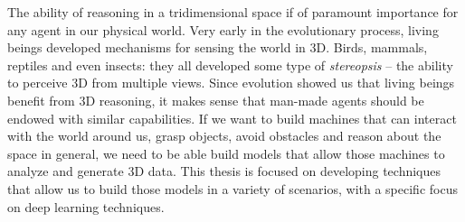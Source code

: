 
The ability of reasoning in a tridimensional space if of paramount importance for any agent in our physical world.
Very early in the evolutionary process, living beings developed mechanisms for sensing the world
in 3D.
Birds, mammals, reptiles and even insects: they all developed some type of \emph{stereopsis} --
the ability to perceive 3D from multiple views.
Since evolution showed us that living beings benefit from 3D reasoning, it makes sense that man-made
agents should be endowed with similar capabilities.
If we want to build machines that can interact with the world around us, grasp objects, avoid obstacles and reason about the space in general, we need to be able build models that allow those machines
to analyze and generate 3D data.
This thesis is focused on developing techniques that allow us to build those models in a variety of scenarios, with a specific focus on deep learning techniques.

